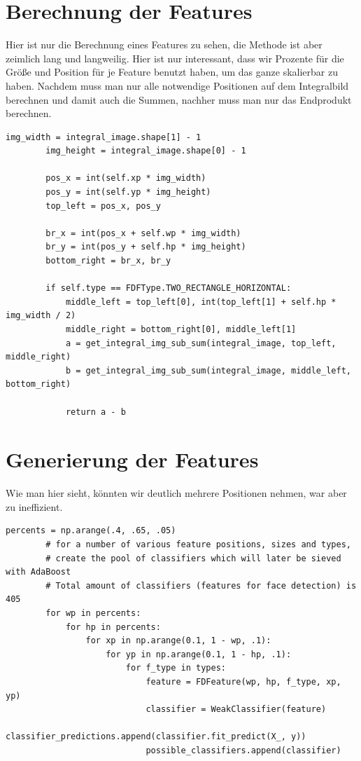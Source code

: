 \section*{Berechnung der Features}

Hier ist nur die Berechnung eines Features zu sehen, die Methode ist aber zeimlich lang und langweilig.
Hier ist nur interessant, dass wir Prozente für die Größe und Position für je Feature benutzt haben,
um das ganze skalierbar zu haben. Nachdem muss man nur alle notwendige Positionen auf dem Integralbild
berechnen und damit auch die Summen, nachher muss man nur das Endprodukt berechnen.

\begin{lstlisting}[style=py]
img_width = integral_image.shape[1] - 1
        img_height = integral_image.shape[0] - 1

        pos_x = int(self.xp * img_width)
        pos_y = int(self.yp * img_height)
        top_left = pos_x, pos_y

        br_x = int(pos_x + self.wp * img_width)
        br_y = int(pos_y + self.hp * img_height)
        bottom_right = br_x, br_y

        if self.type == FDFType.TWO_RECTANGLE_HORIZONTAL:
            middle_left = top_left[0], int(top_left[1] + self.hp * img_width / 2)
            middle_right = bottom_right[0], middle_left[1]
            a = get_integral_img_sub_sum(integral_image, top_left, middle_right)
            b = get_integral_img_sub_sum(integral_image, middle_left, bottom_right)

            return a - b
\end{lstlisting}

\section*{Generierung der Features}
Wie man hier sieht, könnten wir deutlich mehrere Positionen nehmen, war aber zu ineffizient.
\begin{lstlisting}[style=py]
        percents = np.arange(.4, .65, .05)
        # for a number of various feature positions, sizes and types,
        # create the pool of classifiers which will later be sieved with AdaBoost
        # Total amount of classifiers (features for face detection) is 405
        for wp in percents:
            for hp in percents:
                for xp in np.arange(0.1, 1 - wp, .1):
                    for yp in np.arange(0.1, 1 - hp, .1):
                        for f_type in types:
                            feature = FDFeature(wp, hp, f_type, xp, yp)
                            classifier = WeakClassifier(feature)
                            classifier_predictions.append(classifier.fit_predict(X_, y))
                            possible_classifiers.append(classifier)
\end{lstlisting}

